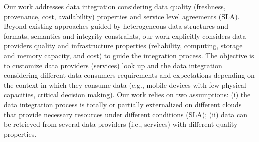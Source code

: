 
%



Our work addresses data integration considering data quality (freshness, provenance, cost, availability) properties and service level agreements (SLA). Beyond existing  approaches guided by heterogeneous data structures and formats, semantics and  integrity constraints, our work  explicitly considers data providers quality  and infrastructure properties (reliability, computing, storage and memory capacity, and cost) to guide the integration process. The objective is to customize data providers (services) look up and the data integration considering different data consumers requirements and expectations depending on the context in which  they consume data (e.g., mobile devices with few physical capacities, critical decision making). Our work relies on two assumptions: (i) the data integration process is totally or partially externalized on different clouds that provide necessary resources under different conditions (SLA); (ii) data can be retrieved from several data providers (i.e., services) with different quality properties.

